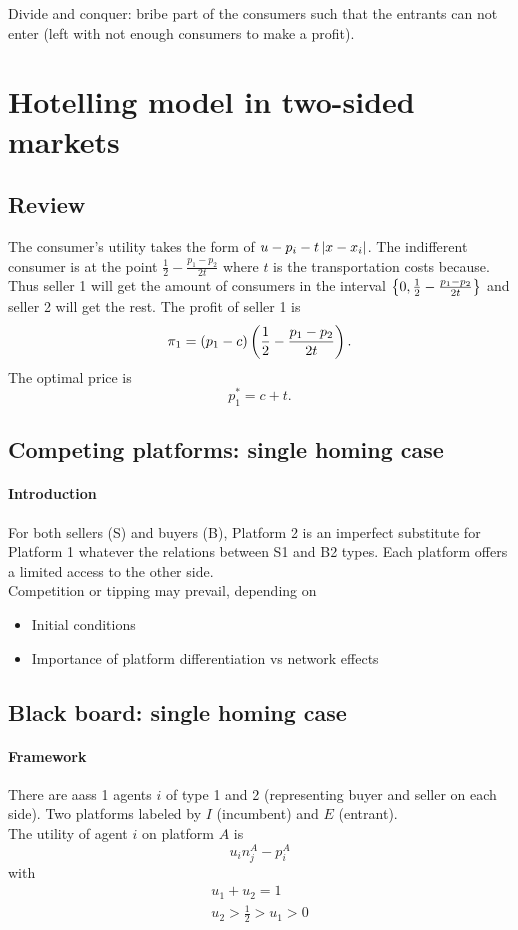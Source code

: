Divide and conquer: bribe part of the consumers such that the entrants can not enter (left with not enough consumers to make a profit).

\section{Hotelling model in two-sided markets}
\subsection{Review}
The consumer's utility takes the form of $u-p_i-t\left| x-x_i\right|$. The indifferent consumer is at the point $\frac{1}{2}-\frac{p_1-p_2}{2t}$ where $t$ is the transportation costs because. Thus seller 1 will get the amount of consumers in the interval $\left\{0,\frac{1}{2}-\frac{p_1-p_2}{2t}\right\}$ and seller 2 will get the rest. The profit of seller 1 is \begin{equation*}
    \pi_1=\left(p_1-c\right)\left(\frac{1}{2}-\frac{p_1-p_2}{2t}\right).
\end{equation*}
The optimal price is \begin{equation*}
    p_1^*=c+t.
\end{equation*}
\subsection{Competing platforms: single homing case}
\paragraph{Introduction}
For both sellers (S) and buyers (B), Platform 2 is an imperfect substitute for Platform 1 whatever the relations between S1 and B2 types. Each platform offers a limited access to the other side.
\\ Competition or tipping may prevail, depending on
\begin{itemize}
    \item Initial conditions
    \item Importance of platform differentiation vs network effects
\end{itemize}

\subsection{Black board: single homing case}
\paragraph{Framework}
There are aass 1 agents $i$ of type 1 and 2 (representing buyer and seller on each side). Two platforms labeled by $I$ (incumbent) and $E$ (entrant).\\
The utility of agent $i$ on platform $A$ is $$u_in_j^A-p_i^A$$ with \begin{align*}
    u_1+u_2=1\\
    u_2>\frac{1}{2}>u_1>0
\end{align*}
